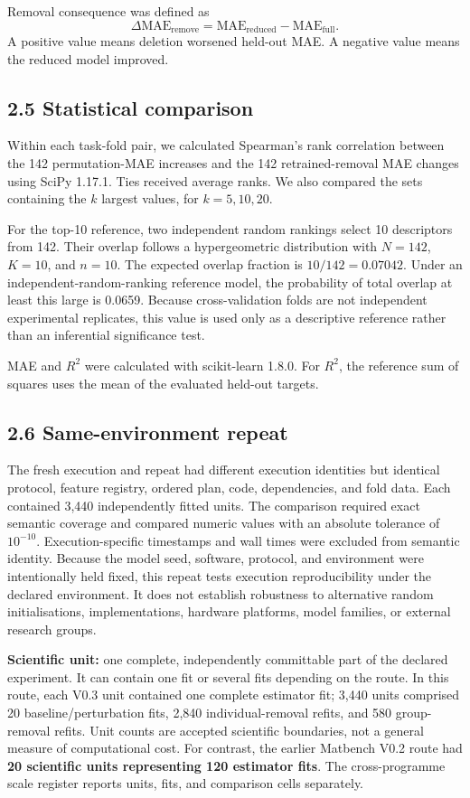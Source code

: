 \documentclass[10pt,a4paper]{article}
\begin{document}
Removal consequence was defined as
\[
\Delta \mathrm{MAE}_{\mathrm{remove}}=\mathrm{MAE}_{\mathrm{reduced}}-\mathrm{MAE}_{\mathrm{full}}.
\]
A positive value means deletion worsened held-out MAE. A negative value means the reduced model improved.

\subsection{2.5 Statistical comparison}
Within each task-fold pair, we calculated Spearman's rank correlation between the 142 permutation-MAE increases and the 142 retrained-removal MAE changes using SciPy 1.17.1. Ties received average ranks. We also compared the sets containing the $k$ largest values, for $k=5,10,20$.

For the top-10 reference, two independent random rankings select 10 descriptors from 142. Their overlap follows a hypergeometric distribution with $N=142$, $K=10$, and $n=10$. The expected overlap fraction is $10/142=0.07042$. Under an independent-random-ranking reference model, the probability of total overlap at least this large is 0.0659. Because cross-validation folds are not independent experimental replicates, this value is used only as a descriptive reference rather than an inferential significance test.

MAE and $R^2$ were calculated with scikit-learn 1.8.0. For $R^2$, the reference sum of squares uses the mean of the evaluated held-out targets.

\subsection{2.6 Same-environment repeat}
The fresh execution and repeat had different execution identities but identical protocol, feature registry, ordered plan, code, dependencies, and fold data. Each contained 3,440 independently fitted units. The comparison required exact semantic coverage and compared numeric values with an absolute tolerance of $10^{-10}$. Execution-specific timestamps and wall times were excluded from semantic identity. Because the model seed, software, protocol, and environment were intentionally held fixed, this repeat tests execution reproducibility under the declared environment. It does not establish robustness to alternative random initialisations, implementations, hardware platforms, model families, or external research groups.

\textbf{Scientific unit:} one complete, independently committable part of the declared experiment. It can contain one fit or several fits depending on the route. In this route, each V0.3 unit contained one complete estimator fit; 3,440 units comprised 20 baseline/perturbation fits, 2,840 individual-removal refits, and 580 group-removal refits. Unit counts are accepted scientific boundaries, not a general measure of computational cost. For contrast, the earlier Matbench V0.2 route had \textbf{20 scientific units representing 120 estimator fits}. The cross-programme scale register reports units, fits, and comparison cells separately.
\end{document}
